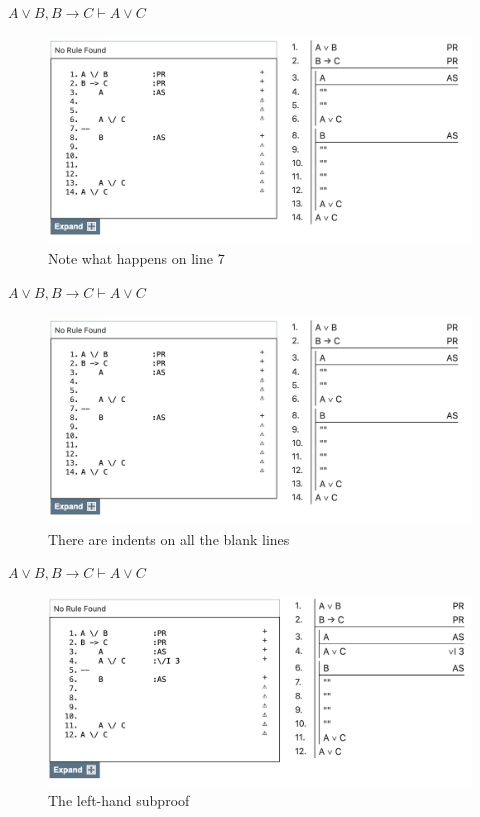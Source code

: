 \documentclass[
  ignorenonframetext,
]{beamer}
\renewcommand{\,}{\text{, }}
\begin{document}
\begin{frame}{\(A \vee B, B \rightarrow C \vdash A \vee C\)}
\protect\hypertarget{a-vee-b-b-rightarrow-c-vdash-a-vee-c-2}{}
\begin{figure}
\centering
\includegraphics[width=\textwidth,height=0.75\textheight]{5_5b.png}
\caption{Note what happens on line 7}
\end{figure}
\end{frame}

\begin{frame}{\(A \vee B, B \rightarrow C \vdash A \vee C\)}
\protect\hypertarget{a-vee-b-b-rightarrow-c-vdash-a-vee-c-3}{}
\begin{figure}
\centering
\includegraphics[width=\textwidth,height=0.75\textheight]{5_5b.png}
\caption{There are indents on all the blank lines}
\end{figure}
\end{frame}

\begin{frame}{\(A \vee B, B \rightarrow C \vdash A \vee C\)}
\protect\hypertarget{a-vee-b-b-rightarrow-c-vdash-a-vee-c-4}{}
\begin{figure}
\centering
\includegraphics[width=\textwidth,height=0.75\textheight]{5_5c.png}
\caption{The left-hand subproof}
\end{figure}
\end{frame}
\end{document}
